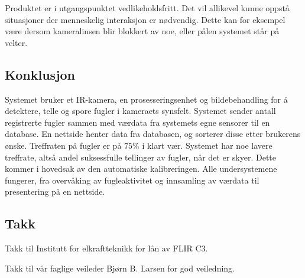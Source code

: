 Produktet er i utgangspunktet vedlikeholdsfritt.
Det vil allikevel kunne oppstå situasjoner der menneskelig interaksjon er nødvendig. 
Dette kan for eksempel være dersom kameralinsen blir blokkert av noe, eller pålen systemet står på velter. 

\subsection{Konklusjon}
Systemet bruker et IR-kamera, en prosesseringsenhet og bildebehandling for å detektere, telle og spore fugler i kameraets synsfelt. 
Systemet sender antall registrerte fugler sammen med værdata fra systemets egne sensorer til en database.
En nettside henter data fra databasen, og sorterer disse etter brukerens ønske. Treffraten på fugler er på $75\%$ i klart vær. 
Systemet har noe lavere treffrate, altså andel suksessfulle tellinger av fugler, når det er skyer.
Dette kommer i hovedsak av den automatiske kalibreringen. 
Alle undersystemene fungerer, fra overvåking av fugleaktivitet og innsamling av værdata til presentering på en nettside.


\subsection{Takk}

Takk til Institutt for elkraftteknikk for lån av FLIR C3. 

Takk til vår faglige veileder Bjørn B. Larsen for god veiledning.